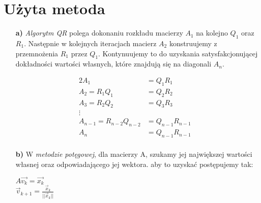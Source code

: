\documentclass{article}
\begin{document}
  \section{Użyta metoda}
  \begin{enumerate}
    \item[\bf{a)}] \textit{Algorytm QR} polega dokonaniu rozkładu macierzy $A_1$ na kolejno $Q_1$ oraz $R_1$. Następnie w kolejnych iteracjach macierz $A_2$ konstruujemy z przemnożenia $R_1$ przez $Q_1$. Kontynuujemy to do uzyskania satysfakcjonującej dokładności wartości własnych, które znajdują się na diagonali  $A_n$.
    \begin{center}
      \begin{alignat*}{2}
        A_1 &= Q_1R_1 & \\
        A_2 = R_1Q_1 & = Q_2R_2& \\
        A_3 = R_2Q_2 & = Q_3R_3& \\
        \vdots \\
        A_{n-1} = R_{n-2}Q_{n-2} & = Q_{n-1}R_{n-1}& \\
        A_{n} &= Q_{n-1}R_{n-1}& \\
    \end{alignat*}
    \end{center}
    \item[\bf{b)}] W \textit{metodzie potęgowej}, dla macierzy A, szukamy jej największej wartości własnej oraz odpowiadającego jej wektora. aby to uzyskać postępujemy tak:
    \begin{center}
      $A\vec{v_k} = \vec{x_k}$ \\
      $\vec{v}_{k+1} = \frac{\vec{x}_k}{||\vec{x}_k||}$
    \end{center}


\end{enumerate}
\end{document}
